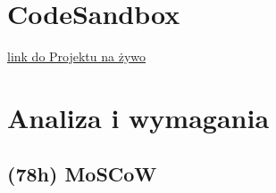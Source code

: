 \documentclass[a4paper,11pt]{article}
\begin{document}
\maketitle
\section{CodeSandbox}
\href{https://codesandbox.io/p/github/adas77/panel/main}{link do Projektu na żywo}


\section{Analiza i wymagania}
\subsection{(78h) MoSCoW}
\end{document}
